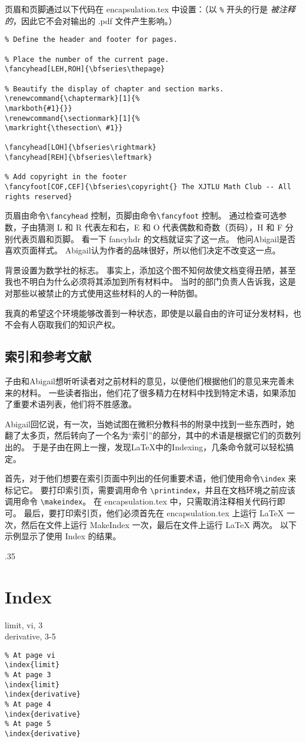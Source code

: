 页眉和页脚通过以下代码在 encapsulation.tex 中设置：（以 \verb=%= 开头的行是 \emph{被注释的}，因此它不会对输出的 .pdf 文件产生影响。）
\begin{lstlisting}
% Define the header and footer for pages.

% Place the number of the current page.
\fancyhead[LEH,ROH]{\bfseries\thepage}

% Beautify the display of chapter and section marks.
\renewcommand{\chaptermark}[1]{%
\markboth{#1}{}}
\renewcommand{\sectionmark}[1]{%
\markright{\thesection\ #1}}

\fancyhead[LOH]{\bfseries\rightmark}
\fancyhead[REH]{\bfseries\leftmark}

% Add copyright in the footer
\fancyfoot[COF,CEF]{\bfseries\copyright{} The XJTLU Math Club -- All rights reserved}
\end{lstlisting}
页眉由命令\verb=\fancyhead= 控制，页脚由命令\verb=\fancyfoot= 控制。 通过检查可选参数，子由猜测 L 和 R 代表左和右，E 和 O 代表偶数和奇数（页码），H 和 F 分别代表页眉和页脚。 看一下 fancyhdr 的文档就证实了这一点。 他问Abigail是否喜欢页面样式。 Abigail认为作者的品味很好，所以他们决定不改变这一点。

背景设置为数学社的标志。 事实上，添加这个图不知何故使文档变得丑陋，甚至我也不明白为什么必须将其添加到所有材料中。 当时的部门负责人告诉我，这是对那些以被禁止的方式使用这些材料的人的一种防御。

我真的希望这个环境能够改善到一种状态，即使是以最自由的许可证分发材料，也不会有人窃取我们的知识产权。

\subsection{索引和参考文献}
子由和Abigail想听听读者对之前材料的意见，以便他们根据他们的意见来完善未来的材料。 一些读者指出，他们花了很多精力在材料中找到特定术语，如果添加了重要术语列表，他们将不胜感激。

Abigail回忆说，有一次，当她试图在微积分教科书的附录中找到一些东西时，她翻了太多页，然后转向了一个名为“索引”的部分，其中的术语是根据它们的页数列出的。 于是子由在网上一搜，发现\LaTeX{}中的Indexing，几条命令就可以轻松搞定。

首先，对于他们想要在索引页面中列出的任何重要术语，他们使用命令\verb=\index= 来标记它。 要打印索引页，需要调用命令 \verb=\printindex=，并且在文档环境之前应该调用命令 \verb=\makeindex=。 在 encapsulation.tex 中，只需取消注释相关代码行即可。 最后，要打印索引页，他们必须首先在 encapsulation.tex 上运行 \LaTeX{} 一次，然后在文件上运行 MakeIndex 一次，最后在文件上运行 \LaTeX{} 两次。 以下示例显示了使用 Index 的结果。
\begin{miniexammar}{.35\textandmarginlen}{
\section*{Index}
limit, vi, 3\\
derivative, 3-5
}
\begin{lstlisting}
% At page vi
\index{limit}
% At page 3
\index{limit}
\index{derivative}
% At page 4
\index{derivative}
% At page 5
\index{derivative}
\end{lstlisting}
\end{miniexammar}

